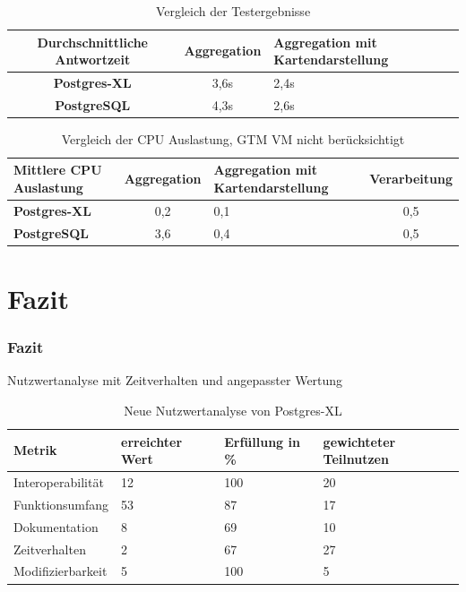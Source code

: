 \documentclass{beamer}
\begin{document}
\begin{frame}\frametitle{}
\begin{table}
\centering
\small
\begin{tabular}{|c|c|C{3cm}|}
\hline
\textbf{Durchschnittliche Antwortzeit} & \textbf{Aggregation} & \textbf{Aggregation mit Kartendarstellung} \\ \hline
\textbf{Postgres-XL} & 3,6s & 2,4s \\ \hline
\textbf{PostgreSQL} & 4,3s & 2,6s \\ \hline
\end{tabular}
\caption{Vergleich der Testergebnisse}
\end{table}

\begin{table}
\centering
\small
\begin{tabular}{|C{2.4cm}|c|C{2.9cm}|c|}
\hline
\textbf{Mittlere CPU Auslastung} & \textbf{Aggregation} & \textbf{Aggregation mit Kartendarstellung} & \textbf{Verarbeitung} \\ \hline
\textbf{Postgres-XL} & 0,2 & 0,1 & 0,5 \\ \hline
\textbf{PostgreSQL} & 3,6 & 0,4 & 0,5 \\ \hline	
\end{tabular}
\caption{Vergleich der CPU Auslastung, GTM VM nicht berücksichtigt}
\end{table}
\end{frame}

\section{Fazit}
 
\begin{frame}\frametitle{Fazit}
\begin{center}
Nutzwertanalyse mit Zeitverhalten und angepasster Wertung %
\end{center}
\begin{table}[h!]
\centering
\small
\begin{tabular}{|l|p{1.8cm}|l|p{1.8cm}|}
\hline
\textbf{Metrik} & \textbf{erreichter Wert} & \textbf{Erfüllung in \%} & \textbf{gewichteter Teilnutzen} \\ \hline
Interoperabilität & 12 & 100 & 20 \\ \hline
Funktionsumfang & 53 & 87 & 17 \\ \hline
Dokumentation & 8 & 69 & 10 \\ \hline
Zeitverhalten & 2 & 67 &  27 \\ \hline
Modifizierbarkeit & 5 & 100 & 5 \\ \hline
\end{tabular}
\caption{Neue Nutzwertanalyse von Postgres-XL}
\end{table}
\end{frame}
 
\end{document}
